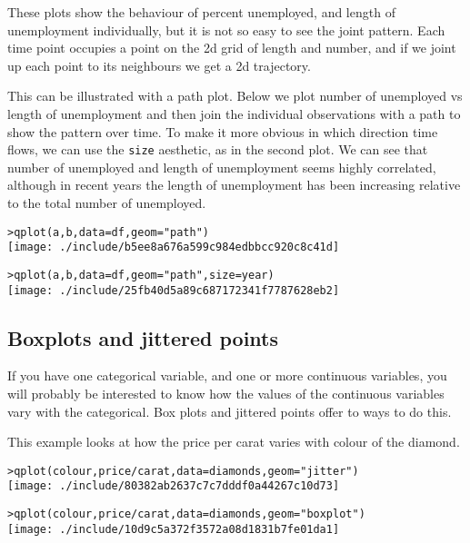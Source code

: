 These plots show the behaviour of percent unemployed, and length of unemployment individually, but it is not so easy to see the joint pattern.  Each time point occupies a point on the 2d grid of length and number, and if we joint up each point to its neighbours we get a 2d trajectory.

This can be illustrated with a path plot.  Below we plot number of unemployed vs length of unemployment and then join the individual observations with a path to show the pattern over time.  To make it more obvious in which direction time flows, we can use the {\tt size} aesthetic, as in the second plot.  We can see that number of unemployed and length of unemployment seems highly correlated, although in recent years the length of unemployment has been increasing relative to the total number of unemployed.

\begin{alltt}
> qplot(a, b, data = df, geom = "path")
\texttt{[image: ./include/b5ee8a676a599c984edbbcc920c8c41d]}

> qplot(a, b, data = df, geom = "path", size = year)
\texttt{[image: ./include/25fb40d5a89c687172341f7787628eb2]}

\end{alltt}

\subsection{Boxplots and jittered points}\label{sub:boxplot}

If you have one categorical variable, and one or more continuous variables, you will probably be interested to know how the values of the continuous variables vary with the categorical.  Box plots and jittered points offer to ways to do this.  

This example looks at how the price per carat varies with colour of the diamond.

\begin{alltt}
> qplot(colour, price/carat, data = diamonds, geom = "jitter")
\texttt{[image: ./include/80382ab2637c7c7dddf0a44267c10d73]}

> qplot(colour, price/carat, data = diamonds, geom = "boxplot")
\texttt{[image: ./include/10d9c5a372f3572a08d1831b7fe01da1]}

\end{alltt}

